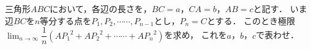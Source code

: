 \documentclass[../../main.tex]{subfiles}
\begin{document}
三角形$ABC$において，各辺の長さを，$BC=a$，$CA=b$，$AB=c$と記す．
いま辺$BC$を$n$等分する点を$P_1,P_2,\cdots\cdots,P_{n-1}$とし，$P_n=C$とする．
このとき極限$\displaystyle\lim_{n\to\infty}\dfrac{1}{n}({AP_1}^2+{AP_2}^2+\cdots\cdots+{AP_n}^2)$を求め，
これを$a$，$b$，$c$で表わせ．
\end{document}
